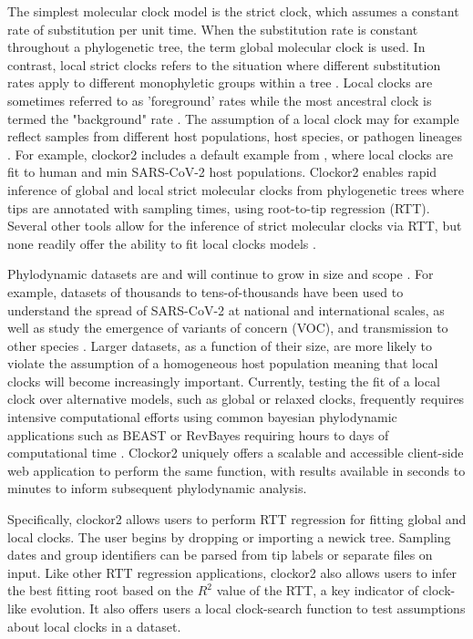 \documentclass{article}
\begin{document}
The simplest molecular clock model is the strict clock, which assumes a constant rate of substitution per unit time. When the substitution rate is constant throughout a phylogenetic tree, the term global molecular clock is used. In contrast, local strict clocks refers to the situation where different substitution rates apply to different monophyletic groups within a tree \citep{ho2014molecular}. Local clocks are sometimes referred to as 'foreground' rates while the most ancestral clock is termed the "background" rate \citep{yoder2000estimation}. The assumption of a local clock may for example reflect samples from different host populations, host species, or pathogen lineages \citep{worobey_synchronized_2014}. For example, clockor2 includes a default example from \citet{porter2023evolutionary}, where local clocks are fit to human and min SARS-CoV-2 host populations. Clockor2 enables rapid inference of global and local strict molecular clocks from phylogenetic trees where tips are annotated with sampling times, using root-to-tip regression (RTT). Several other tools allow for the inference of strict molecular clocks via RTT, but none readily offer the ability to fit local clocks models \citep{rambaut_exploring_2016, hadfield_nextstrain_2018,sagulenko_treetime_2018,volz_scalable_2017}. 

Phylodynamic datasets are and will continue to grow in size and scope \cite{featherstone2022epidemiological}. For example, datasets of thousands to tens-of-thousands have been used to understand the spread of SARS-CoV-2 at national and international scales, as well as study the emergence of variants of concern (VOC), and transmission to other species \citep{du_plessis_establishment_2021,hill_origins_2022,nadeau_swiss_2023,porter2023evolutionary}. Larger datasets, as a function of their size, are more likely to violate the assumption of a homogeneous host population meaning that local clocks will become increasingly important. Currently, testing the fit of a local clock over alternative models, such as global or relaxed clocks, frequently requires intensive computational  efforts using common bayesian phylodynamic applications such as BEAST or RevBayes requiring hours to days of computational time \citep{bouckaert_beast_2019, suchard_bayesian_2018, hoehna_2016_revbayes}. Clockor2 uniquely offers a scalable and accessible client-side web application to perform the same function, with results available in seconds to minutes to inform subsequent phylodynamic analysis.

Specifically, clockor2 allows users to perform RTT regression for fitting global and local clocks. The user begins by dropping or importing a newick tree. Sampling dates and group identifiers can be parsed from tip labels or separate files on input. Like other RTT regression applications, clockor2 also allows users to infer the best fitting root based on the $R^2$ value of the RTT, a key indicator of clock-like evolution. It also offers users a local clock-search function to test assumptions about local clocks in a dataset. 
\end{document}
